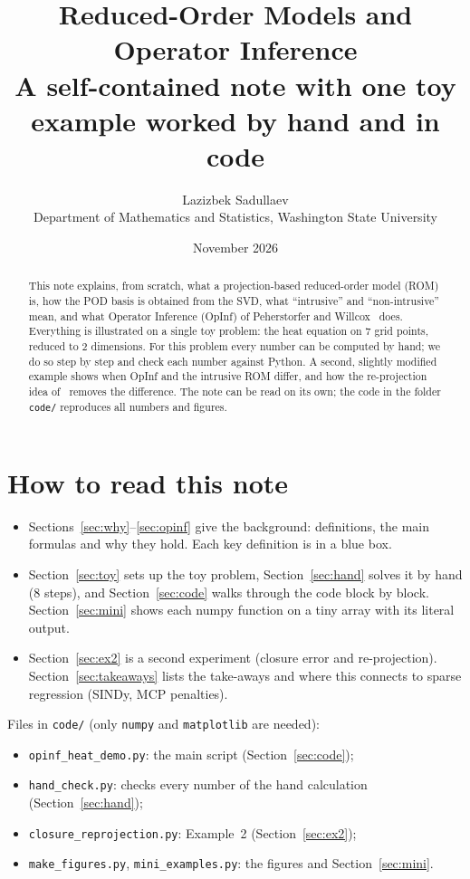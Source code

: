 \documentclass[11pt]{article}
\title{Reduced-Order Models and Operator Inference\\[2pt]
\large A self-contained note with one toy example worked by hand and in code}
\author{Lazizbek Sadullaev\\ \small Department of Mathematics and Statistics, Washington State University}
\date{November 2026}
\theoremstyle{remark}\newtheorem{remark}{Remark}
\begin{document}
\maketitle

\begin{abstract}
This note explains, from scratch, what a projection-based reduced-order model (ROM) is, how the POD basis is obtained from the SVD, what ``intrusive'' and ``non-intrusive'' mean, and what Operator Inference (OpInf) of Peherstorfer and Willcox~\cite{PW16} does. Everything is illustrated on a single toy problem: the heat equation on 7 grid points, reduced to 2 dimensions. For this problem every number can be computed by hand; we do so step by step and check each number against Python. A second, slightly modified example shows when OpInf and the intrusive ROM differ, and how the re-projection idea of~\cite{P20} removes the difference. The note can be read on its own; the code in the folder \texttt{code/} reproduces all numbers and figures.
\end{abstract}

\tableofcontents

\section{How to read this note}
\begin{itemize}[leftmargin=1.5em]
\item Sections~\ref{sec:why}--\ref{sec:opinf} give the background: definitions, the main formulas and why they hold. Each key definition is in a blue box.
\item Section~\ref{sec:toy} sets up the toy problem, Section~\ref{sec:hand} solves it by hand (8 steps), and Section~\ref{sec:code} walks through the code block by block. Section~\ref{sec:mini} shows each numpy function on a tiny array with its literal output.
\item Section~\ref{sec:ex2} is a second experiment (closure error and re-projection). Section~\ref{sec:takeaways} lists the take-aways and where this connects to sparse regression (SINDy, MCP penalties).
\end{itemize}
Files in \texttt{code/} (only \texttt{numpy} and \texttt{matplotlib} are needed):
\begin{itemize}[leftmargin=1.5em,itemsep=0pt]
\item \texttt{opinf\_heat\_demo.py}: the main script (Section~\ref{sec:code});
\item \texttt{hand\_check.py}: checks every number of the hand calculation (Section~\ref{sec:hand});
\item \texttt{closure\_reprojection.py}: Example~2 (Section~\ref{sec:ex2});
\item \texttt{make\_figures.py}, \texttt{mini\_examples.py}: the figures and Section~\ref{sec:mini}.
\end{itemize}
\end{document}
